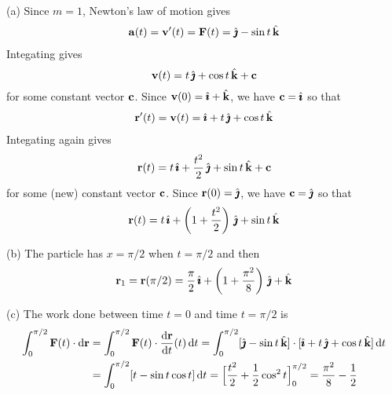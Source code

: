 \begin{solution} (a) Since $m=1$, Newton's law of motion gives
\begin{align*}
\mathbf{a}(t) = \mathbf{v}'(t) = \mathbf{F}(t) = \hat{\pmb{\jmath}} - \sin t\, \hat{\mathbf{k}}
\end{align*}
Integating gives
\begin{equation*}
\mathbf{v}(t) = t\,\hat{\pmb{\jmath}} +\cos t\,\hat{\mathbf{k}} +\mathbf{c}
\end{equation*}
for some constant vector $\mathbf{c}$. Since $\mathbf{v}(0)=\hat{\pmb{\imath}}+\hat{\mathbf{k}}$, we have $\mathbf{c} = \hat{\pmb{\imath}}$
so that
\begin{align*}
\mathbf{r}'(t) = \mathbf{v}(t) = \hat{\pmb{\imath}} + t\,\hat{\pmb{\jmath}} +\cos t\,\hat{\mathbf{k}}
\end{align*}
Integating again gives
\begin{equation*}
\mathbf{r}(t) = t\,\hat{\pmb{\imath}}+\frac{t^2}{2}\,\hat{\pmb{\jmath}} +\sin t\,\hat{\mathbf{k}} +\mathbf{c}
\end{equation*}
for some (new) constant vector $\mathbf{c}$. Since $\mathbf{r}(0)=\hat{\pmb{\jmath}}$, we have 
$\mathbf{c} = \hat{\pmb{\jmath}}$
so that
\begin{align*}
\mathbf{r}(t) = t\,\hat{\pmb{\imath}}+\left(1+\frac{t^2}{2}\right)\,\hat{\pmb{\jmath}} +\sin t\,\hat{\mathbf{k}}
\end{align*}

\noindent (b) The particle has $x=\pi/2$ when $t=\pi/2$ and then
\begin{align*}
\mathbf{r}_1=\mathbf{r}(\pi/2) = \frac{\pi}{2}\,\hat{\pmb{\imath}}+\left(1+\frac{\pi^2}{8}\right)\,\hat{\pmb{\jmath}} + \hat{\mathbf{k}}
\end{align*}

\noindent (c)
The work done between time $t=0$ and time $t=\pi/2$ is
\begin{align*}
\int_0^{\pi/2} \vF(t)\cdot \dee{\vr}
&=\int_0^{\pi/2} \vF(t)\cdot \diff{\vr}{t}(t)\,\dee{t}
=\int_0^{\pi/2} [\hj-\sin t\,\hk]\cdot [\hi+t\,\hj+\cos t\,\hk]\,\dee{t} \\
&= \int_0^{\pi/2} [t -\sin t\cos t]\,\dee{t}
=\Big[\frac{t^2}{2}+\frac{1}{2}\cos^2 t\Big]_0^{\pi/2}
=\frac{\pi^2}{8}-\frac{1}{2}
\end{align*}

\end{solution}




